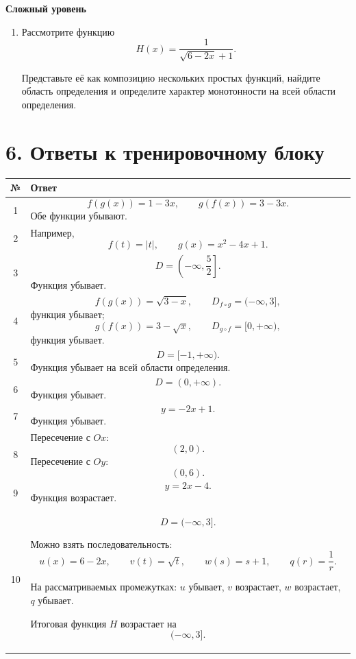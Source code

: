 \documentclass[a4paper,12pt]{article}
\newcommand{\sect}[1]{\section*{\textcolor{darkaccent}{#1}}}
\begin{document}
\textbf{Сложный уровень}

\begin{enumerate}[resume]

  \item
  Рассмотрите функцию
  \[
  H(x)=\frac1{\sqrt{6-2x}+1}.
  \]

  Представьте её как композицию нескольких простых функций,
  найдите область определения и определите характер монотонности
  на всей области определения.

\end{enumerate}

\clearpage

\sect{6. Ответы к тренировочному блоку}

\begin{center}
\begin{tabularx}{\linewidth}{@{}cX@{}}
\toprule
№ & Ответ \\
\midrule

1
&
\[
f(g(x))=1-3x,
\qquad
g(f(x))=3-3x.
\]
Обе функции убывают.
\\

2
&
Например,
\[
f(t)=|t|,
\qquad
g(x)=x^2-4x+1.
\]
\\

3
&
\[
D=\left(-\infty,\frac52\right].
\]
Функция убывает.
\\

4
&
\[
f(g(x))=\sqrt{3-x},
\qquad
D_{f\circ g}=(-\infty,3],
\]
функция убывает;
\[
g(f(x))=3-\sqrt{x},
\qquad
D_{g\circ f}=[0,+\infty),
\]
функция убывает.
\\

5
&
\[
D=[-1,+\infty).
\]
Функция убывает на всей области определения.
\\

6
&
\[
D=(0,+\infty).
\]
Функция убывает.
\\

7
&
\[
y=-2x+1.
\]
Функция убывает.
\\

8
&
Пересечение с $Ox$:
\[
(2,0).
\]
Пересечение с $Oy$:
\[
(0,6).
\]
\\

9
&
\[
y=2x-4.
\]
Функция возрастает.
\\

10
&
\[
D=(-\infty,3].
\]

Можно взять последовательность:
\[
u(x)=6-2x,
\qquad
v(t)=\sqrt{t},
\qquad
w(s)=s+1,
\qquad
q(r)=\frac1r.
\]

На рассматриваемых промежутках:
$u$ убывает,
$v$ возрастает,
$w$ возрастает,
$q$ убывает.

Итоговая функция $H$ возрастает на
\[
(-\infty,3].
\]
\\

\bottomrule
\end{tabularx}
\end{center}
\end{document}
